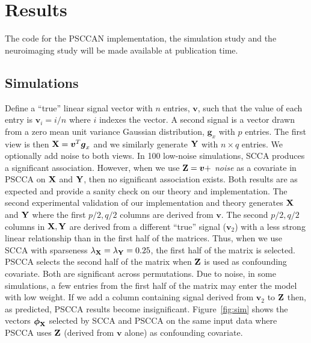 \documentclass{llncs}
\newcommand{\X}{{\bf X}}
\newcommand{\Y}{{\bf Y}}
\newcommand{\Z}{{\bf Z}}
\newcommand{\bs}{\boldsymbol}
\begin{document}
\section{Results}
The code for the PSCCAN implementation, the simulation study and the
neuroimaging study will be made available at publication time. 
\subsection{Simulations} Define a ``true'' linear signal vector with
$n$ entries, ${\bs v}$, such that the value of each entry is ${\bs
v}_i=i/n$ where $i$ indexes the vector.  A second signal is a vector drawn from a zero mean unit
variance Gaussian distribution, ${\bs g_x}$ with $p$ entries.  The
first view is then $\X ={\bs v}^T {\bs g_x}$ and we similarly generate
$\Y $ with $n \times q$ entries.  We optionally add noise to both
views.  In 100 low-noise simulations, SCCA produces a significant
association.  However, when we use $\Z = {\bs v} + $ {\em noise} as a
covariate in PSCCA on $\X$ and $\Y$, then no significant association
exists.  Both results are as expected and provide a sanity check on
our theory and implementation.  The second experimental validation of
our implementation and theory generates $\X$ and $\Y$ where the first
$p/2, q/2$ columns are derived from ${\bs v}$.  The second $p/2, q/2$
columns in $\X, \Y$ are derived from a different ``true'' signal (${\bs v}_2$) with
a less strong linear relationship than in the first half of the
matrices.  Thus, when we use SCCA with sparseness
$\lambda_{\X}=\lambda_{\Y}=0.25$, the first half of the matrix is
selected.  PSCCA selects the second half of the matrix when $\Z$ is
used as confounding covariate.  Both are significant across permutations.  Due to
noise, in some simulations, a few entries from the first half of the
matrix may enter the model with low weight.  If we add a column containing signal derived from ${\bs
  v}_2$ to $\Z$ then, as predicted, PSCCA results become insignificant. Figure~\ref{fig:sim}
shows the vectors $\bs\phi_{\X}$ selected by SCCA and PSCCA on the
same input data where PSCCA uses $\Z$ (derived from ${\bs v}$ alone)
as confounding covariate. 
\end{document}
